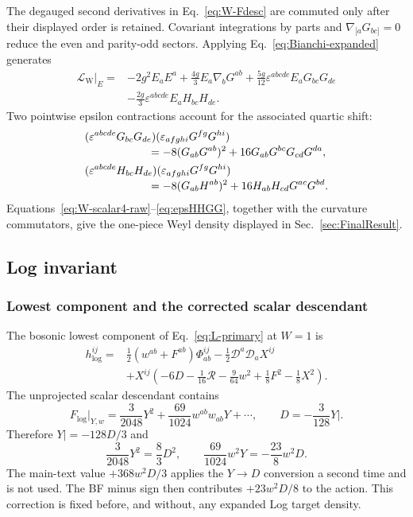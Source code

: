 \documentclass[11pt]{article}
\newcommand{\cL}{\mathcal L}
\newcommand{\cD}{\mathcal D}
\newcommand{\cR}{\mathcal R}
\newcommand{\eps}{\varepsilon}
\newcommand{\Weyl}{\mathrm W}
\newcommand{\Log}{\log}
\begin{document}
The degauged second derivatives in Eq.~\eqref{eq:W-Fdesc} are commuted only
after their displayed order is retained.  Covariant integrations by parts
and $\nabla_{[a}G_{bc]}=0$ reduce the even and parity-odd sectors.  Applying
Eq.~\eqref{eq:Bianchi-expanded} generates
\begin{align}
\cL_{\Weyl}\big|_{E}={}&-2g^2E_aE^a
+\frac{4g}{3}E_a\nabla_bG^{ab}
+\frac{5g}{12}\eps^{abcde}E_aG_{bc}G_{de}
\nonumber\\
&-\frac{2g}{3}\eps^{abcde}E_aH_{bc}H_{de}.
\label{eq:W-E-expanded}
\end{align}
Two pointwise epsilon contractions account for the associated quartic shift:
\begin{align}
&(\eps^{abcde}G_{bc}G_{de})
(\eps_{afghi}G^{fg}G^{hi})
\nonumber\\[-1mm]
&\hspace{20mm}=-8(G_{ab}G^{ab})^2
+16G_{ab}G^{bc}G_{cd}G^{da},
\label{eq:epsGGGG}\\
&(\eps^{abcde}H_{bc}H_{de})
(\eps_{afghi}G^{fg}G^{hi})
\nonumber\\[-1mm]
&\hspace{20mm}=-8(G_{ab}H^{ab})^2
+16H_{ab}H_{cd}G^{ac}G^{bd}.
\label{eq:epsHHGG}
\end{align}
Equations~\eqref{eq:W-scalar4-raw}--\eqref{eq:epsHHGG}, together with the
curvature commutators, give the one-piece Weyl density displayed in
Sec.~\ref{sec:FinalResult}.

\subsection{Log invariant}

\subsubsection{Lowest component and the corrected scalar descendant}

The bosonic lowest component of Eq.~\eqref{eq:L-primary} at $W=1$ is
\begin{align}
h_{\Log}^{ij}={}&\frac12(w^{ab}+F^{ab})\Phi_{ab}^{ij}
-\frac12\cD^a\cD_aX^{ij}
\nonumber\\
&+X^{ij}\left(-6D-\frac1{16}\cR
-\frac9{64}w^2+\frac18F^2-\frac18X^2\right).
\label{eq:L-lowest}
\end{align}
The unprojected scalar descendant contains
\begin{equation}
F_{\Log}\big|_{Y,w}=\frac3{2048}Y^2
+\frac{69}{1024}w^{ab}w_{ab}Y+\cdots,
\qquad D=-\frac3{128}Y\big|.
\label{eq:L-Yraw}
\end{equation}
Therefore $Y|=-128D/3$ and
\begin{equation}
\frac3{2048}Y^2=\frac83D^2,
\qquad
\frac{69}{1024}w^2Y=-\frac{23}{8}w^2D.
\label{eq:L-YD}
\end{equation}
The main-text value $+368w^2D/3$ applies the $Y\to D$ conversion a second
time and is not used.  The BF minus sign then contributes
$+23w^2D/8$ to the action.  This correction is fixed before, and without,
any expanded Log target density.
\end{document}
